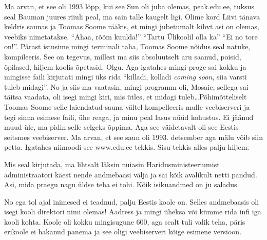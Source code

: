 Ma arvan, et see oli 1993 lõpp, kui see Sun oli juba olemas, 
peak.edu.ee,  tuksus seal Bauman juures  riiuli peal, ma 
sain talle kaugelt ligi. Olime kord  Liivi tänava keldris saunas ja Toomas Soome 
rääkis, et  mingi jubetumalt kihvt asi on olemas, veebiks nimetatakse. 
\enquote{Ahaa, rõõm kuulda!} \enquote{Tartu Ülikoolil olla ka} \enquote{Ei no 
tore on!}. Pärast istusime mingi terminali taha, Toomas Soome nõidus seal 
natuke, kompileeris. See on tegevus, millest ma siis absoluutselt aru saanud, 
poisid, õpilased, hiljem koolis õpetasid. Olgu. Aga igatahes mingi proge sai  
kokku ja  mingisse faili kirjutati mingi üks rida  \enquote{killadi, kolladi 
\emph{coming soon}, siia varsti tuleb midagi}. No ja siis ma vaatasin, mingi 
programm oli, Mosaic, sellega sai täitsa vaadata, oli isegi mingi kiri, mis 
ütles, et midagi tuleb\ldots Põhimõtteliselt Toomas Soome selle laiendatud 
sauna vältel kompelleeris mulle veebiserveri ja tegi sinna esimese faili, ühe 
reaga, ja minu  peal  lasus nüüd kohustus. Ei jäänud muud üle, ma pidin selle 
selgeks õppima. Aga see väidetavalt oli see Eestis seitsmes veebiserver. Ma 
arvan, et see saun oli 1993. detsember aga mälu võib siin petta. Igatahes 
niimoodi see www.edu.ee tekkis. Sisu tekkis alles palju 
hiljem.


Mis seal kirjutada, ma lihtsalt läksin nuiasin Haridusministeeriumist 
administraatori käest nende andmebaasi välja ja sai kõik avalikult netti 
pandud. Asi, mida praegu nagu üldse teha ei tohi. Kõik isikuandmed on ju 
saladus.


No ega tol ajal inimesed ei teadnud, palju Eestis koole on. Selles andmebaasis 
oli isegi kooli direktori nimi olemas! Aadress ja mingi üheksa või kümme rida 
infi iga kooli kohta. Koole oli kokku mingisugune 600, aga sealt tuli  valik 
teha, päris erikoole ei hakanud panema ja see oligi veebiserveri kõige esimene 
versioon. 

